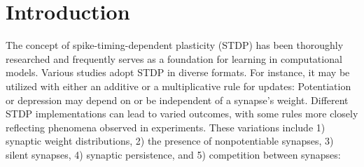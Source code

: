 \documentclass[utf8]{FrontiersinHarvard} %
\begin{document}
\section{Introduction}
The concept of spike-timing-dependent plasticity (STDP) has been thoroughly researched and frequently serves as a foundation for learning in computational models. Various studies adopt STDP in diverse formats. For instance, it may be utilized with either an additive or a multiplicative rule for updates: Potentiation or depression may depend on or be independent of a synapse's weight. Different STDP implementations can lead to varied outcomes, with some rules more closely reflecting phenomena observed in experiments. These variations include 1) synaptic weight distributions, 2) the presence of nonpotentiable synapses, 3) silent synapses, 4) synaptic persistence, and 5) competition between synapses:
\end{document}
